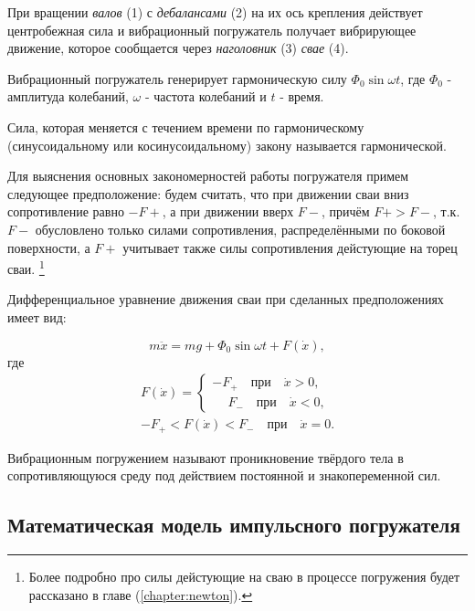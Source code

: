 \noindent При вращении \textit{валов} (1) с \textit{дебалансами} (2) на их ось крепления действует центробежная сила
и вибрационный погружатель получает вибрирующее движение, которое сообщается через \textit{наголовник} (3) \textit{свае} (4).

\noindent Вибрационный погружатель генерирует гармоническую силу $\Phi_0 \sin \omega t$,
где $\Phi_0$ - амплитуда колебаний, $\omega$ - частота колебаний и $t$ - время.

\begin{definition}
    Сила, которая меняется с течением времени по гармоническому (синусоидальному или косинусоидальному)
    закону называется гармонической.
\end{definition}

Для выяснения основных закономерностей работы погружателя примем следующее предположение: будем считать, что
при движении сваи вниз сопротивление равно $-F+$, а при движении вверх $F-$, причём $F+ > F-$, т.к. $F-$ обусловлено только
силами сопротивления, распределёнными по боковой поверхности, а $F+$ учитывает также силы сопротивления дейстующие на
торец сваи. \footnote{Более подробно про силы дейстующие на сваю в процессе погружения будет рассказано
в главе (\ref{chapter:newton}).}

Дифференциальное уравнение движения сваи при сделанных предположениях имеет вид:

\begin{equation}
    m\ddot{x} = mg + \Phi_0 \sin \omega t + F(\dot{x}),
\end{equation}
где
\begin{equation}
    \begin{aligned}
        F(\dot{x}) =
        \begin{cases}
            -F_+ \quad \text{при} \quad \dot{x} > 0,\\
            \phantom{-}F_- \quad \text{при} \quad \dot{x} < 0,
        \end{cases}\\
        -F_+ < F(\dot{x}) < F_- \quad \text{при} \quad \dot{x} = 0.
    \end{aligned}
\end{equation}

\begin{definition}
    Вибрационным погружением называют проникновение твёрдого тела в сопротивляющуюся среду
    под действием постоянной и знакопеременной сил.
\end{definition}

\subsection{Математическая модель импульсного погружателя}

